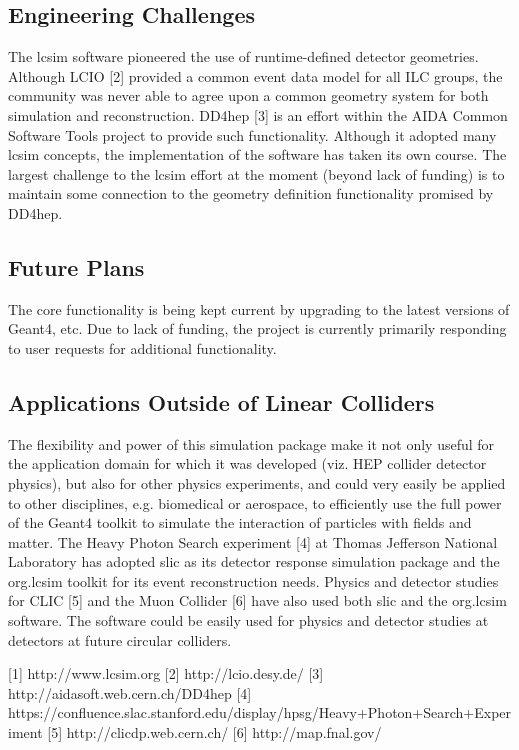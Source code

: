 \subsection{Engineering Challenges}

The lcsim software pioneered the use of runtime-defined detector geometries.
Although LCIO [2] provided a common event data model for all ILC groups, the
community was never able to agree upon a common geometry system for both
simulation and reconstruction. DD4hep [3] is an effort within the AIDA Common
Software Tools project to provide such functionality. Although it adopted many
lcsim concepts, the implementation of the software has taken its own course. The
largest challenge to the lcsim effort at the moment (beyond lack of funding) is
to maintain some connection to the geometry definition functionality promised by
DD4hep.

\subsection{Future Plans}

The core functionality is being kept current by upgrading to the latest versions
of Geant4, etc. Due to lack of funding, the project is currently primarily
responding to user requests for additional functionality.

\subsection{Applications Outside of Linear Colliders}

The flexibility and power of this simulation package make it not only useful for
the application domain for which it was developed (viz. HEP collider detector
physics), but also for other physics experiments, and could very easily be
applied to other disciplines, e.g. biomedical or aerospace, to efficiently use
the full power of the Geant4 toolkit to simulate the interaction of particles
with fields and matter. The Heavy Photon Search experiment [4] at Thomas
Jefferson National Laboratory has adopted slic as its detector response
simulation package and the org.lcsim toolkit for its event reconstruction needs.
Physics and detector studies for CLIC [5] and the Muon Collider [6] have also
used both slic and the org.lcsim software. The software could be easily used for
physics and detector studies at detectors at future circular colliders.


[1] http://www.lcsim.org
[2] http://lcio.desy.de/
[3] http://aidasoft.web.cern.ch/DD4hep
[4] https://confluence.slac.stanford.edu/display/hpsg/Heavy+Photon+Search+Experiment [5] http://clicdp.web.cern.ch/
[6] http://map.fnal.gov/

